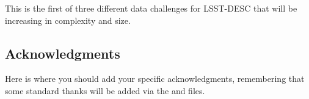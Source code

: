 \documentclass[\docopts]{\docclass}
\begin{document}
This is the first of three different data challenges for LSST-DESC that will be increasing in complexity and size.

\subsection*{Acknowledgments}

Here is where you should add your specific acknowledgments, remembering that some standard thanks will be added
via the  and  files.







\end{document}
